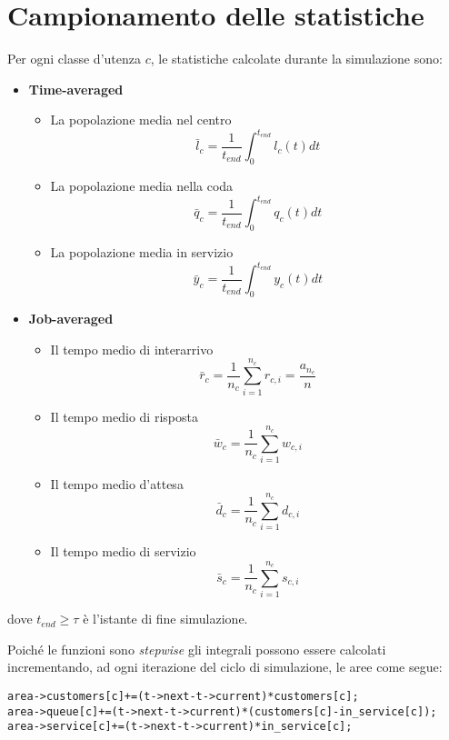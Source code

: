 \section{Campionamento delle statistiche}
Per ogni classe d'utenza $c$, le statistiche calcolate durante la simulazione sono:
\begin{itemize}
\item \textbf{Time-averaged}
\begin{itemize}
\item La popolazione media nel centro
\begin{equation}
\bar{l}_c=\frac{1}{t_{end}}\int_0^{t_{end}} l_c(t) dt
\end{equation}
\item La popolazione media nella coda
\begin{equation}
\bar{q}_c=\frac{1}{t_{end}}\int_0^{t_{end}} q_c(t) dt
\end{equation}
\item La popolazione media in servizio 
\begin{equation}
\bar{y}_c=\frac{1}{t_{end}}\int_0^{t_{end}} y_c(t) dt
\end{equation}
\end{itemize}
\item \textbf{Job-averaged}
\begin{itemize}
\item Il tempo medio di interarrivo
\begin{equation}
\bar{r}_c = \frac{1}{n_c} \sum_{i=1}^{n_c} r_{c,i} = \frac{a_{n_c}}{n}
\end{equation}
\item Il tempo medio di risposta
\begin{equation}
\bar{w}_c = \frac{1}{n_c} \sum_{i=1}^{n_c} w_{c,i}
\end{equation}
\item Il tempo medio d'attesa
\begin{equation}
\bar{d}_c = \frac{1}{n_c} \sum_{i=1}^{n_c} d_{c,i}
\end{equation}
\item Il tempo medio di servizio
\begin{equation}
\bar{s}_c = \frac{1}{n_c} \sum_{i=1}^{n_c} s_{c,i}
\end{equation}
\end{itemize}
\end{itemize}
dove $t_{end} \geq \tau$ è l'istante di fine simulazione.

Poiché le funzioni sono \textit{stepwise} gli integrali possono essere calcolati incrementando, ad ogni iterazione del ciclo di simulazione, le aree come segue:
\begin{lstlisting}[caption={Calcolo degli integrali}]
area->customers[c]+=(t->next-t->current)*customers[c];
area->queue[c]+=(t->next-t->current)*(customers[c]-in_service[c]);
area->service[c]+=(t->next-t->current)*in_service[c];
\end{lstlisting}

